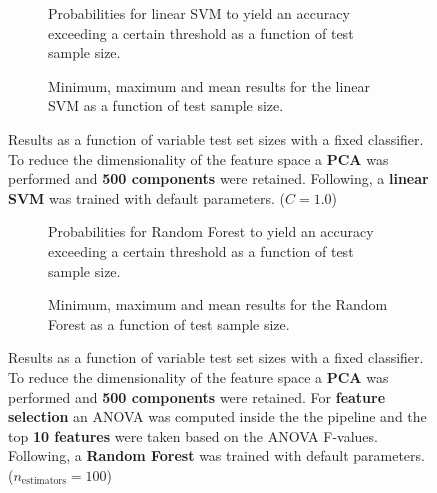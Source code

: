 \begin{figure}
    \captionsetup[subfigure]{justification=justified,singlelinecheck=false}
    \begin{subfigure}[t]{0.61\textwidth}
        
        \caption{Probabilities for linear SVM to yield an accuracy exceeding a certain threshold as a function of test sample size.}
    \end{subfigure}
    \hspace{3.0mm}
    \begin{subfigure}[t]{0.34\textwidth}
        
        \caption{Minimum, maximum and mean results for the linear SVM as a function of test sample size.}
    \end{subfigure}
    \caption[Effects of varying test sample size. Linear SVM; Preprocessing: PCA ($n_\text{components} = \num{500}$)]{Results as a function of variable test set sizes with a fixed classifier. To reduce the dimensionality of the feature space a \textbf{PCA} was performed and \textbf{500 components} were retained. Following, a \textbf{{linear SVM}} was trained with default parameters. ($C=\num{1.0}$)}
    \label{fig:PCA_500_components_no_selection_LinearSVC}
\end{figure}

\begin{figure}
    \captionsetup[subfigure]{justification=justified,singlelinecheck=false}
    \begin{subfigure}[t]{0.61\textwidth}
        
        \caption{Probabilities for Random Forest to yield an accuracy exceeding a certain threshold as a function of test sample size.}
    \end{subfigure}
    \hspace{3.0mm}
    \begin{subfigure}[t]{0.34\textwidth}
        
        \caption{Minimum, maximum and mean results for the Random Forest as a function of test sample size.}
    \end{subfigure}
    \caption[Effects of varying test sample size. Random Forest; Preprocessing: PCA ($n_\text{components} = \num{500}$); ANOVA feature selection ($k_\text{best} = \num{10}$)]{Results as a function of variable test set sizes with a fixed classifier. To reduce the dimensionality of the feature space a \textbf{PCA} was performed and \textbf{500 components} were retained. For \textbf{feature selection} an ANOVA was computed inside the the pipeline and the top \textbf{10 features} were taken based on the ANOVA F-values. Following, a \textbf{{Random Forest}} was trained with default parameters. ($n_\text{estimators}=\num{100}$)}
    \label{fig:PCA_500_components_10_best_selected_RandomForest}
\end{figure}

